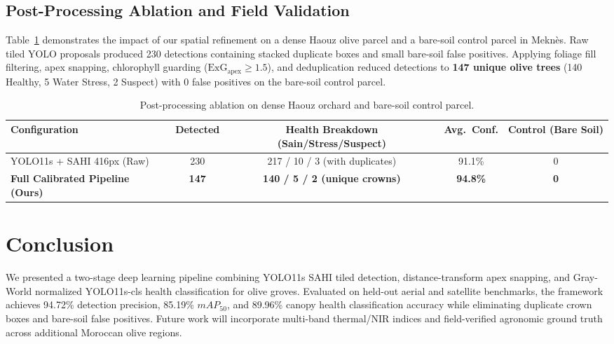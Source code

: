 \documentclass[runningheads]{llncs}
\begin{document}
\subsection{Post-Processing Ablation and Field Validation}
Table~\ref{tab:ablation} demonstrates the impact of our spatial refinement on a dense Haouz olive parcel and a bare-soil control parcel in Meknès. Raw tiled YOLO proposals produced 230 detections containing stacked duplicate boxes and small bare-soil false positives. Applying foliage fill filtering, apex snapping, chlorophyll guarding ($\text{ExG}_{\text{apex}}\ge1.5$), and deduplication reduced detections to \textbf{147 unique olive trees} (140 Healthy, 5 Water Stress, 2 Suspect) with 0 false positives on the bare-soil control parcel.

\begin{table}[t]
\centering
\caption{Post-processing ablation on dense Haouz orchard and bare-soil control parcel.}
\label{tab:ablation}
\begin{tabular}{lcccc}
\toprule
\textbf{Configuration} & \textbf{Detected} & \textbf{Health Breakdown (Sain/Stress/Suspect)} & \textbf{Avg.\ Conf.} & \textbf{Control (Bare Soil)} \\
\midrule
YOLO11s + SAHI 416px (Raw) & 230 & 217 / 10 / 3 (with duplicates) & 91.1\% & 0 \\
\textbf{Full Calibrated Pipeline (Ours)} & \textbf{147} & \textbf{140 / 5 / 2 (unique crowns)} & \textbf{94.8\%} & \textbf{0} \\
\bottomrule
\end{tabular}
\end{table}

\section{Conclusion}
We presented a two-stage deep learning pipeline combining YOLO11s SAHI tiled detection, distance-transform apex snapping, and Gray-World normalized YOLO11s-cls health classification for olive groves. Evaluated on held-out aerial and satellite benchmarks, the framework achieves 94.72\% detection precision, 85.19\% $mAP_{50}$, and 89.96\% canopy health classification accuracy while eliminating duplicate crown boxes and bare-soil false positives. Future work will incorporate multi-band thermal/NIR indices and field-verified agronomic ground truth across additional Moroccan olive regions.
\end{document}
